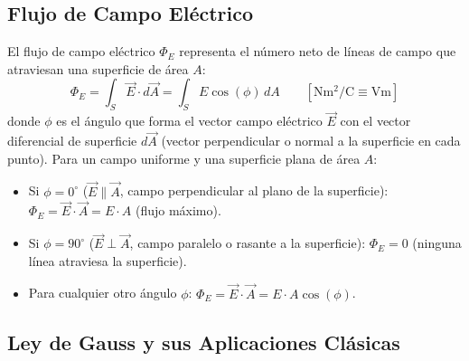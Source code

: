 \subsection{Flujo de Campo Eléctrico}

\begin{definicion}
El flujo de campo eléctrico $\Phi_E$ representa el número neto de líneas de campo que atraviesan una superficie de área $A$:
\begin{equation}
    \Phi_E = \int_S \vec{E} \cdot d\vec{A} = \int_S E \cos(\phi)\, dA \qquad \left[\si{\newton\meter\squared\per\coulomb} \equiv \si{\volt\meter}\right]
\end{equation}
donde $\phi$ es el ángulo que forma el vector campo eléctrico $\vec{E}$ con el vector diferencial de superficie $d\vec{A}$ (vector perpendicular o normal a la superficie en cada punto). Para un campo uniforme y una superficie plana de área $A$:
\begin{itemize}[leftmargin=*]
    \item Si $\phi = 0^\circ$ ($\vec{E} \parallel \vec{A}$, campo perpendicular al plano de la superficie): $\Phi_E = \vec{E}\cdot\vec{A} = E \cdot A$ (flujo máximo).
    \item Si $\phi = 90^\circ$ ($\vec{E} \perp \vec{A}$, campo paralelo o rasante a la superficie): $\Phi_E = 0$ (ninguna línea atraviesa la superficie).
    \item Para cualquier otro ángulo $\phi$: $\Phi_E = \vec{E}\cdot\vec{A} = E \cdot A \cos(\phi)$.
\end{itemize}
\end{definicion}

\subsection{Ley de Gauss y sus Aplicaciones Clásicas}

